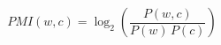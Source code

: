 \documentclass[preview]{standalone}
\begin{document}
\begin{align*}
PMI(w,c)=\log_{2}\!\left(\dfrac{P(w,c)}{P(w)\,P(c)}\right)
\end{align*}
\end{document}
